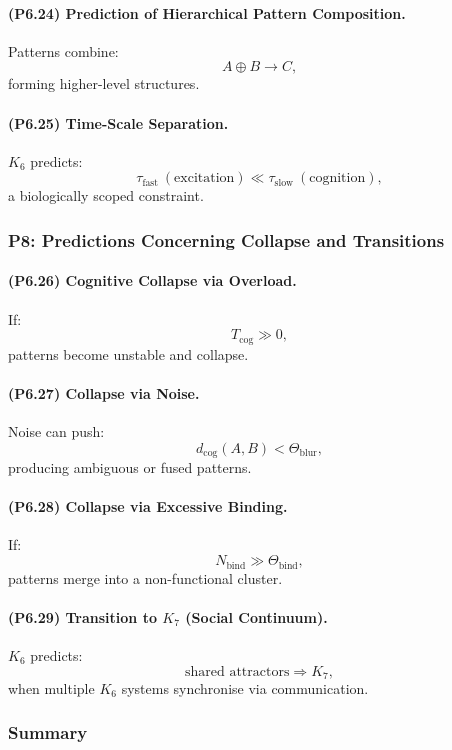 \paragraph{(P6.24) Prediction of Hierarchical Pattern Composition.}
Patterns combine:
\[
A \oplus B \to C,
\]
forming higher-level structures.

\paragraph{(P6.25) Time-Scale Separation.}
$K_6$ predicts:
\[
\tau_{\mathrm{fast}} \ (\text{excitation}) \ll \tau_{\mathrm{slow}} \ (\text{cognition}),
\]
a biologically scoped constraint.

\subsubsection{P8: Predictions Concerning Collapse and Transitions}

\paragraph{(P6.26) Cognitive Collapse via Overload.}
If:
\[
T_{\mathrm{cog}} \gg 0,
\]
patterns become unstable and collapse.

\paragraph{(P6.27) Collapse via Noise.}
Noise can push:
\[
d_{\mathrm{cog}}(A,B) < \Theta_{\mathrm{blur}},
\]
producing ambiguous or fused patterns.

\paragraph{(P6.28) Collapse via Excessive Binding.}
If:
\[
N_{\mathrm{bind}} \gg \Theta_{\mathrm{bind}},
\]
patterns merge into a non-functional cluster.

\paragraph{(P6.29) Transition to \texorpdfstring{$K_7$}{K_7} (Social Continuum).}
$K_6$ predicts:
\[
\text{shared attractors} \Rightarrow K_7,
\]
when multiple $K_6$ systems synchronise via communication.

\subsubsection{Summary}

